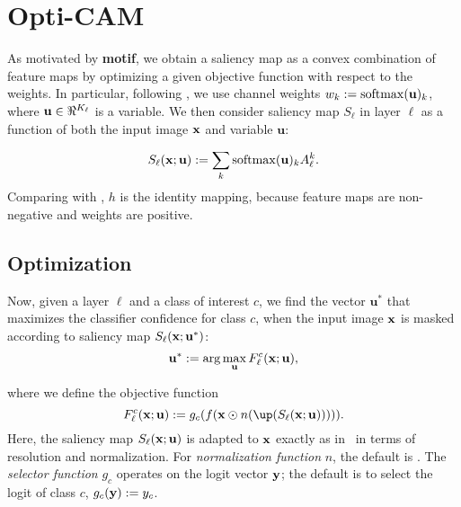 \section{Opti-CAM}
\label{sec:oc_def}
As motivated by \textbf{motif}, we obtain a saliency map as a convex combination of feature maps
 by optimizing a given objective function with respect to the weights.
In particular, following \autocite{wang2020score}, we use channel weights $w_k \mathrel{:=} \operatorname{softmax}(
	\mathbf{u})_k$, where $\mathbf{u} \in \real^{K_\ell}$ is a variable.
We then consider saliency map $S_\ell$ in layer $\ell$ as a function of both the input image $\mathbf{x}$ 
and variable $\mathbf{u}$:

\begin{equation}
    S_\ell(\mathbf{x}; \mathbf{u}) \mathrel{:=} \sum_k \operatorname{softmax}(\mathbf{u})_k A^k_\ell.
\label{eq:v-sal}
\end{equation}
Comparing with , $h$ is the identity mapping, because feature maps are non-negative and
 weights are positive.


\subsection{Optimization}
Now, given a layer $\ell$ and a class of interest $c$, we find the vector $\mathbf{u}^*$ that
 maximizes the classifier confidence for class $c$, when the input image $\mathbf{x}$ is masked according 
 to saliency map $S_\ell(\mathbf{x}; \mathbf{u}^*)$:
\begin{equation}
	\mathbf{u}^* \mathrel{:=} \arg\max_{\mathbf{u}} F^c_\ell(\mathbf{x}; \mathbf{u}),
\label{eq:opt}
\end{equation}

where we define the objective function
\begin{equation}
	F^c_\ell(\vx; \mathbf{u}) \defn g_c(f(\vx \odot n(\up(S_\ell(\vx; \mathbf{u}))))).
\label{eq:obj}
\end{equation}
Here, the saliency map $S_\ell(\mathbf{x}; \mathbf{u})$ is adapted to $\mathbf{x}$ exactly as in~ in 
terms of resolution and normalization. For \emph{normalization function} $n$, the default is
 . 
The \emph{selector function} $g_c$ operates on the logit vector $\mathbf{y}$; the default is to select the
 logit of class $c$, \ie $g_c(\mathbf{y}) \mathrel{:=} y_c$. %

